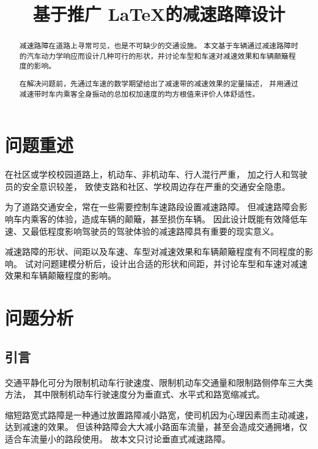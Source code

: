 \documentclass[withoutpreface,bwprint]{cumcmthesis}
\title{基于推广 \LaTeX 的减速路障设计}
\begin{document}
\maketitle
\begin{abstract}

减速路障在道路上寻常可见，也是不可缺少的交通设施。
本文基于车辆通过减速路障时的汽车动力学响应而设计几种可行的形状，并讨论车型和车速对减速效果和车辆颠簸程度的影响。

在解决问题前，先通过车速的数学期望给出了减速带的减速效果的定量描述，
并用通过减速带时车内乘客全身振动的总加权加速度的均方根值来评价人体舒适性。

\end{abstract}

\section{问题重述}

在社区或学校校园道路上，机动车、非机动车、行人混行严重，
加之行人和驾驶员的安全意识较差，
致使支路和社区、学校周边存在严重的交通安全隐患。

为了道路交通安全，常在一些需要控制车速路段设置减速路障。
但减速路障会影响车内乘客的体验，造成车辆的颠簸，甚至损伤车辆。
因此设计既能有效降低车速、又最低程度影响驾驶员的驾驶体验的减速路障具有重要的现实意义。

减速路障的形状、间距以及车速、车型对减速效果和车辆颠簸程度有不同程度的影响。
试对问题建模分析后，设计出合适的形状和间距，并讨论车型和车速对减速效果和车辆颠簸程度的影响。

\section{问题分析}

\subsection{引言}


交通平静化可分为限制机动车行驶速度、限制机动车交通量和限制路侧停车三大类方法，
其中限制机动车行驶速度分为垂直式、水平式和路宽缩减式。

缩短路宽式路障是一种通过放置路障减小路宽，使司机因为心理因素而主动减速，达到减速的效果。
但该种路障会大大减小路面车流量，甚至会造成交通拥堵，仅适合车流量小的路段使用。
故本文只讨论垂直式减速路障。
\end{document}
